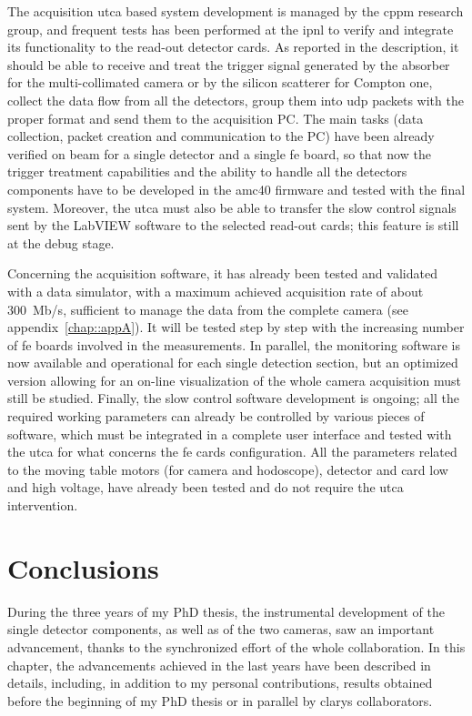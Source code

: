 The acquisition \gls{utca} based system development is managed by the \gls{cppm} research group, and frequent tests has been performed at the \gls{ipnl} to verify and integrate its functionality to the read-out detector cards. As reported in the description, it should be able to receive and treat the trigger signal generated by the absorber for the multi-collimated camera or by the silicon scatterer for Compton one, collect the data flow from all the detectors, group them into \gls{udp} packets with the proper format and send them to the acquisition PC. The main tasks (data collection, packet creation and communication to the PC) have been already verified on beam for a single detector and a single \gls{fe} board, so that now the trigger treatment capabilities and the ability to handle all the detectors components have to be developed in the \gls{amc}40 firmware and tested with the final system. Moreover, the \gls{utca} must also be able to transfer the slow control signals sent by the LabVIEW software to the selected read-out cards; this feature is still at the debug stage.

Concerning the acquisition software, it has already been tested and validated with a data simulator, with a maximum achieved acquisition rate of about 300~Mb/s, sufficient to manage the data from the complete camera (see appendix~\ref{chap::appA}). It will be tested step by step with the increasing number of \gls{fe} boards involved in the measurements. In parallel, the monitoring software is now available and operational for each single detection section, but an optimized version allowing for an on-line visualization of the whole camera acquisition must still be studied. Finally, the slow control software development is ongoing; all the required working parameters can already be controlled by various pieces of software, which must be integrated in a complete user interface and tested with the \gls{utca} for what concerns the \gls{fe} cards configuration. All the parameters related to the moving table motors (for camera and hodoscope), detector and card low and high voltage, have already been tested and do not require the \gls{utca} intervention.        

\section{Conclusions}\label{chap3::sec::conclusion}

During the three years of my PhD thesis, the instrumental development of the single detector components, as well as of the two cameras, saw an important advancement, thanks to the synchronized effort of the whole collaboration. In this chapter, the advancements achieved in the last years have been described in details, including, in addition to my personal contributions,  results obtained before the beginning of my PhD thesis or in parallel by \gls{clarys} collaborators.

